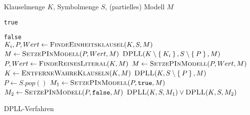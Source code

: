 \documentclass{article}
\begin{document}
\begin{preview}
    \begin{algorithm}[H]
        \begin{algorithmic}
            \Require Klauselmenge $K$, Symbolmenge $S$, (partielles) Modell $M$

                \State \Return \texttt{true}
            \EndIf

                \State \Return \texttt{false}
            \EndIf
			\\

            \State $K_i, P, Wert \gets \Call{FindeEinheitsklausel}{K, S, M}$
                \State $M \gets \Call{SetzePInModell}{P, Wert, M}$
                \State \Return $\Call{DPLL}{K \setminus \Set{K_i}, S \setminus \Set{P}, M}$
            \EndIf
			\\

            \State $P, Wert \gets \Call{FindeReinesLiteral}{K, M}$
                \State $M \gets \Call{SetzePInModell}{P, Wert, M}$
				\State $K \gets \Call{EntferneWahreKlauseln}{K, M}$
                \State \Return $\Call{DPLL}{K, S \setminus \Set{P}, M}$
            \EndIf
			\\

            \State $P \gets S.pop()$ 
            \State $M_1 \gets \Call{SetzePInModell}{P, \texttt{true}, M}$
            \State $M_2 \gets \Call{SetzePInModell}{P, \texttt{false}, M}$
            \State \Return $\Call{DPLL}{K, S, M_1} \lor \Call{DPLL}{K, S, M_2}$
			\EndProcedure
        \end{algorithmic}
    \caption{DPLL-Verfahren}
    \label{alg:dpll}
    \end{algorithm}
\end{preview}
\end{document}
